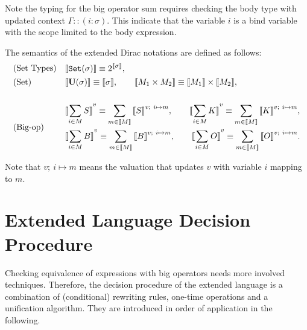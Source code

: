 Note the typing for the big operator sum requires checking the body type with updated context $\Gamma :: (i : \sigma)$. This indicate that the variable $i$ is a bind variable with the scope limited to the body expression. 

\begin{definition}
  The semantics of the extended Dirac notations are defined as follows:
  \begin{align*}
    & \text{(Set Types)} && \begin{aligned}
      \sem{\texttt{Set}(\sigma)} \equiv 2^{\sem{\sigma}},
    \end{aligned} \\
    & \text{(Set)} && \begin{aligned}
      \sem{\mathbf{U}(\sigma)} \equiv \sem{\sigma},
      \qquad
      \sem{M_1 \times M_2} \equiv \sem{M_1} \times \sem{M_2},
    \end{aligned} \\
    \\
    & \text{(Big-op)} && \begin{aligned}
      & \sem{\sum_{i \in M} S}^v \equiv \sum_{m \in \sem{M}} \sem{S}^{v;\ i\mapsto m},
      \qquad
      \sem{\sum_{i \in M} K}^v \equiv \sum_{m \in \sem{M}} \sem{K}^{v;\ i\mapsto m},
      \\
      & \sem{\sum_{i \in M} B}^v \equiv \sum_{m \in \sem{M}} \sem{B}^{v;\ i\mapsto m},
      \qquad
      \sem{\sum_{i \in M} O}^v \equiv \sum_{m \in \sem{M}} \sem{O}^{v;\ i\mapsto m}.
    \end{aligned}
  \end{align*}
\end{definition}

Note that $v;\ i \mapsto m$ means the valuation that updates $v$ with variable $i$ mapping to $m$.

\section{Extended Language Decision Procedure}
Checking equivalence of expressions with big operators needs more involved techniques. 
Therefore, the decision procedure of the extended language is a combination of (conditional) rewriting rules, one-time operations and a unification algorithm. They are introduced in order of application in the following.


